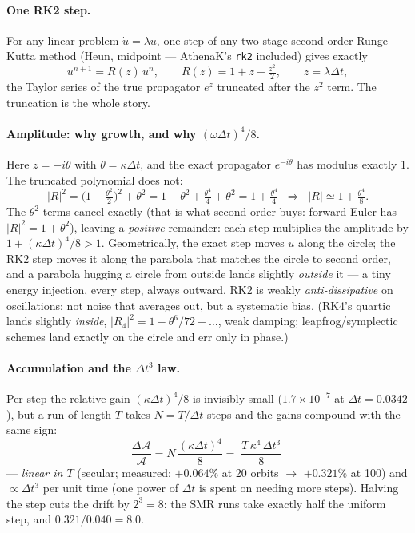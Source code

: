 \documentclass[11pt]{article}
\begin{document}
\paragraph{One RK2 step.}
For any linear problem $\dot u = \lambda u$, one step of any two-stage
second-order Runge--Kutta method (Heun, midpoint --- AthenaK's \texttt{rk2}
included) gives exactly
\begin{equation}
u^{n+1} = R(z)\,u^{n}, \qquad R(z) = 1 + z + \tfrac{z^2}{2}, \qquad
z = \lambda\Delta t ,
\end{equation}
the Taylor series of the true propagator $e^{z}$ truncated after the $z^2$
term. The truncation is the whole story.

\paragraph{Amplitude: why growth, and why $(\omega\Delta t)^4/8$.}
Here $z = -i\theta$ with $\theta = \kappa\Delta t$, and the exact propagator
$e^{-i\theta}$ has modulus exactly 1. The truncated polynomial does not:
\begin{equation}
|R|^2 = \Big(1 - \tfrac{\theta^2}{2}\Big)^{2} + \theta^2
      = 1 - \theta^2 + \tfrac{\theta^4}{4} + \theta^2
      = 1 + \tfrac{\theta^4}{4}
\;\;\Longrightarrow\;\;
|R| \simeq 1 + \tfrac{\theta^4}{8} .
\end{equation}
The $\theta^2$ terms cancel exactly (that is what second order buys: forward
Euler has $|R|^2 = 1+\theta^2$), leaving a \emph{positive} remainder: each step
multiplies the amplitude by $1 + (\kappa\Delta t)^4/8 > 1$. Geometrically, the
exact step moves $u$ along the circle; the RK2 step moves it along the parabola
that matches the circle to second order, and a parabola hugging a circle from
outside lands slightly \emph{outside} it --- a tiny energy injection, every
step, always outward. RK2 is weakly \emph{anti-dissipative} on oscillations:
not noise that averages out, but a systematic bias. (RK4's quartic lands
slightly \emph{inside}, $|R_4|^2 = 1 - \theta^6/72 + \ldots$, weak damping;
leapfrog/symplectic schemes land exactly on the circle and err only in phase.)

\paragraph{Accumulation and the $\Delta t^3$ law.}
Per step the relative gain $(\kappa\Delta t)^4/8$ is invisibly small
($1.7\times10^{-7}$ at $\Delta t = 0.0342$), but a run of length $T$ takes
$N = T/\Delta t$ steps and the gains compound with the same sign:
\begin{equation}
\frac{\Delta\mathcal A}{\mathcal A}
= N\,\frac{(\kappa\Delta t)^4}{8}
= \boxed{\;\frac{T\,\kappa^4\,\Delta t^3}{8}\;}
\end{equation}
--- \emph{linear in $T$} (secular; measured: $+0.064\%$ at 20 orbits
$\to$ $+0.321\%$ at 100) and $\propto\Delta t^3$ per unit time (one power of
$\Delta t$ is spent on needing more steps). Halving the step cuts the drift by
$2^3 = 8$: the SMR runs take exactly half the uniform step, and
$0.321/0.040 = 8.0$.
\end{document}
